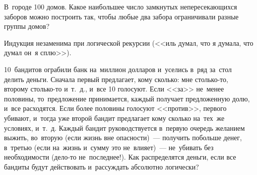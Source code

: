 \begin{problems}

\item
В~городе 100 домов.
Какое наибольшее число замкнутых непересекающихся заборов можно построить так,
чтобы любые два забора ограничивали разные группы домов?

\end{problems}

Индукция незаменима при логической рекурсии
(<<иль думал, что я думала, что думал он~я сплю>>).

\begin{problems}

\item
10~бандитов ограбили банк на~миллион долларов и~уселись в~ряд за~стол делить
деньги.
Сначала первый предлагает, кому сколько: мне столько-то, второму столько-то
и~т.~д., и~все 10 голосуют.
Если <<за>> не~менее половины, то~предложение принимается, каждый получает
предложенную долю, и~все расходятся.
Если более половины голосуют <<против>>, первого убивают, и~тогда уже второй
бандит предлагает кому сколько на~тех~же условиях, и~т.~д.
Каждый бандит руководствуется в~первую очередь желанием выжить, во~вторую
(если жизнь вне опасности)~--- получить побольше денег, в~третью
(если на~жизнь и~сумму это не~влияет)~--- не~убивать без необходимости
(дело-то не~последнее!).
Как распределятся деньги, если все бандиты будут действовать и~рассуждать
абсолютно логически?

\end{problems}

